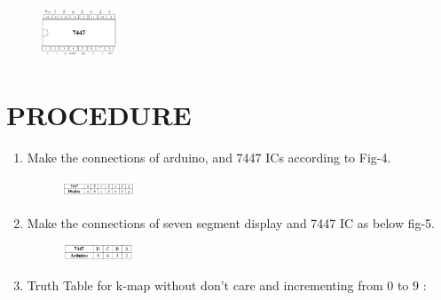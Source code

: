 \documentclass[conference]{IEEEtran}
\begin{document}
\begin{figure}[h]                           
\centering                                 
\includegraphics[width=0.2\textwidth]{3.jpg }                                           
\caption{\label{fig-2:Gates}}               
\end{figure}

\section{PROCEDURE}


\begin{enumerate}

\item Make the connections of arduino, and  7447 ICs according to Fig-4.
	\begin{figure}[h] 
	\centering 
	\includegraphics[width=0.2\textwidth]{4.jpg  }
	\caption{\label{fig-4:Gates}}    
\end{figure}



\item Make the connections of seven segment display and 7447 IC as below fig-5.

\begin{figure}[h]                           
\centering                                 
\includegraphics[width=0.2\textwidth]{5.jpg    }                                           
\caption{\label{fig-5:Gates}}               
\end{figure}


\item {Truth Table for k-map without don't care and incrementing from $0$ to $9$ :  }


\end{enumerate}
\end{document}
